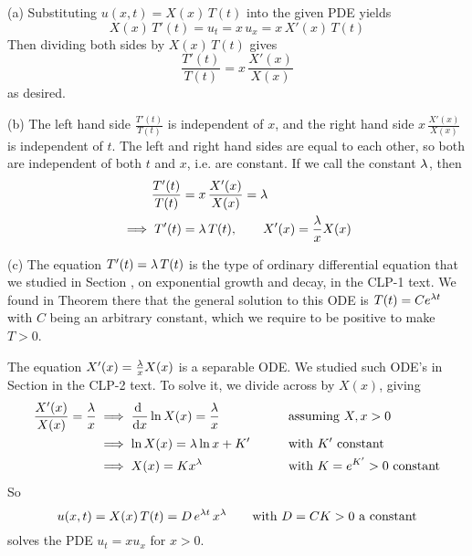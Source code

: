\begin{solution}
(a)
Substituting $u(x,t)= X(x)\,T(t)$ into the given PDE yields
\begin{equation*}
X(x)\,T'(t) = u_t=x\,u_x=x\, X'(x)\,T(t)
\end{equation*}
Then dividing both sides by $X(x)\,T(t)$ gives
\begin{equation*}
\frac{T'(t)}{T(t)} = x\,\frac{X'(x)}{X(x)}
\end{equation*}
as desired.

(b)
The left hand side $\frac{T'(t)}{T(t)}$ is independent of $x$, and 
the right hand side $ x\,\frac{X'(x)}{X(x)}$ is independent of $t$.
The left and right hand sides are equal to each other, so both are independent 
of both $t$ and $x$, i.e. are constant. If we call the constant $\lambda$, then
\begin{align*}
\frac{T'(t)}{T(t)} &= x\,\frac{X'(x)}{X(x)}=\lambda \\
\implies T'(t)&=\lambda\,T(t),\qquad X'(x)=\frac{\lambda}{x} X(x)
\end{align*}

(c)
The equation $T'(t)=\lambda\,T(t)$ is the type of ordinary differential 
equation that we studied in Section ,  
on exponential growth and decay, in the CLP-1 text. We found in 
Theorem  there that the general solution 
to this ODE is $T(t) = Ce^{\lambda t}$ with $C$ 
being an arbitrary constant, which we require to be positive to make $T>0$.

The equation $X'(x)=\frac{\lambda}{x} X(x)$ is a separable ODE. We studied 
such ODE's in Section  in the CLP-2 text.
To solve it, we divide across by $X(x)$, giving
\begin{alignat*}{3}
\frac{X'(x)}{X(x)} = \frac{\la}{x}
&\implies \diff{}{x} \ln X(x) = \frac{\la}{x} 
                   \qquad&&\text{assuming $X,x>0$} \\
&\implies \ln X(x) = \la\ln x+K'\qquad&&\text{with $K'$ constant} \\
&\implies X(x) = K x^\la \qquad&&\text{with $K=e^{K'}>0$ constant} 
\end{alignat*}
So
\begin{equation*}
u(x,t)= X(x)\,T(t)
= D\,e^{\lambda t}\,x^\lambda\qquad
\text{with $D=CK>0$ a constant}
\end{equation*}
solves the PDE $u_t=xu_x$ for $x>0$.
\end{solution}

